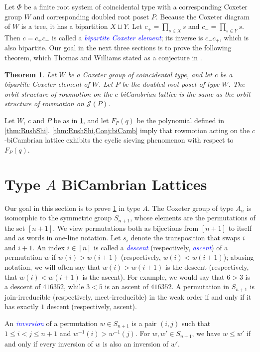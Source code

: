 \documentclass[11pt]{amsart}
\newtheorem{theorem}{Theorem}[section]
\theoremstyle{definition}
\newcommand{\dfn}[1]{\textcolor{blue}{\emph{#1}}}
\begin{document}
Let $\Phi$ be a finite root system of coincidental type with a corresponding Coxeter group $W$ and corresponding doubled root poset $P$. Because the Coxeter diagram of $W$ is a tree, it has a bipartition $X\sqcup Y$. Let $c_+=\prod_{s\in X}s$ and $c_-=\prod_{s\in Y}s$. Then $c=c_+c_-$ is called a \dfn{bipartite Coxeter element}; its inverse is $c_-c_+$, which is also bipartite. Our goal in the next three sections is to prove the following theorem, which Thomas and Williams stated as a conjecture in \cite{ThomasWilliams}.

\begin{theorem}\label{Conj:biCamb}
Let $W$ be a Coxeter group of coincidental type, and let $c$ be a bipartite Coxeter element of $W$. Let $P$ be the doubled root poset of type $W$. The orbit structure of rowmotion on the $c$-biCambrian lattice is the same as the orbit structure of rowmotion on $\mathcal J(P)$.
\end{theorem} 

Let $W$, $c$ and $P$ be as in \cref{Conj:biCamb}, and let $F_P(q)$ be the polynomial defined in \cref{thm:RushShi}. \cref{thm:RushShi,Conj:biCamb} imply that rowmotion acting on the $c$-biCambrian lattice exhibits the cyclic sieving phenomenon with respect to $F_P(q)$.

\section{Type $A$ BiCambrian Lattices}\label{Sec:BiCambrianA}
Our goal in this section is to prove \cref{Conj:biCamb} in type $A$. The Coxeter group of type $A_n$ is isomorphic to the symmetric group $S_{n+1}$, whose elements are the permutations of the set $[n+1]$. We view permutations both as bijections from $[n+1]$ to itself and as words in one-line notation. Let $s_i$ denote the transposition that swaps $i$ and $i+1$. An index $i\in[n]$ is called a \dfn{descent} (respectively, \dfn{ascent}) of a permutation $w$ if $w(i)>w(i+1)$ (respectively, $w(i)<w(i+1)$); abusing notation, we will often say that $w(i)>w(i+1)$ is the descent (respectively, that $w(i)<w(i+1)$ is the ascent). For example, we would say that $6>3$ is a descent of $416352$, while $3<5$ is an ascent of $416352$. A permutation in $S_{n+1}$ is join-irreducible (respectively, meet-irreducible) in the weak order if and only if it has exactly $1$ descent (respectively, ascent). 

An \dfn{inversion} of a permutation $w\in S_{n+1}$ is a pair $(i,j)$ such that $1\leq i<j\leq n+1$ and $w^{-1}(i)>w^{-1}(j)$. For $w,w'\in S_{n+1}$, we have $w\leq w'$ if and only if every inversion of $w$ is also an inversion of $w'$. 
\end{document}
